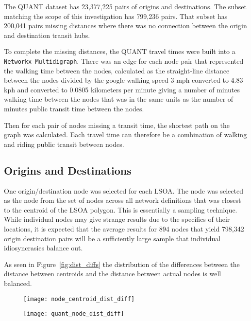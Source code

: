 The QUANT dataset has 23,377,225 pairs of origins and destinations. The subset matching the scope of this investigation has 799,236 pairs. That subset has 200,041 pairs missing distances where there was no connection between the origin and destination transit hubs.

To complete the missing distances, the QUANT travel times were built into a \texttt{Networkx Multidigraph}. There was an edge for each node pair that represented the walking time between the nodes, calculated as the straight-line distance between the nodes divided by the google walking speed 3 mph converted to 4.83 kph and converted to 0.0805 kilometers per minute giving a number of minutes walking time between the nodes that was in the same units as the number of minutes public transit time between the nodes. 

Then for each pair of nodes missing a transit time, the shortest path on the graph was calculated. Each travel time can therefore be a combination of walking and riding public transit between nodes. 

\subsection{Origins and Destinations}

One origin/destination node was selected for each LSOA. The node was selected as the node from the set of nodes across all network definitions that was closest to the centroid of the LSOA polygon. This is essentially a sampling technique. While individual nodes may give strange results due to the specifics of their locations, it is expected that the average results for 894 nodes that yield 798,342 origin destination pairs will be a sufficiently large sample that individual idiosyncrasies balance out. 

As seen in Figure~\ref{fig:dist_diffs} the distribution of the differences between the distance between centroids and the distance between actual nodes is well balanced. 

\begin{figure}
\centering
\begin{minipage}{.5\textwidth}
  \centering
  \texttt{[image: node\_centroid\_dist\_diff]}
  \label{fig:dist_diffs}
\end{minipage}%
\begin{minipage}{.5\textwidth}
  \centering
  \texttt{[image: quant\_node\_dist\_diff]}
  \label{fig:quant_dist_diffs}
\end{minipage}
\end{figure}

